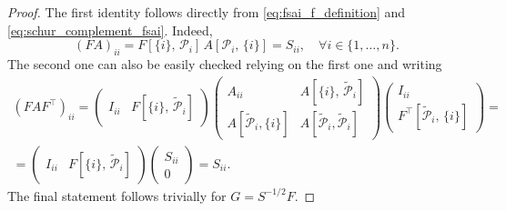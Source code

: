 \documentclass[10pt,a4paper]{amsart}
\begin{document}
\begin{proof}
	The first identity follows directly from \eqref{eq:fsai_f_definition} and \eqref{eq:schur_complement_fsai}. Indeed,
	\begin{equation*}
		(FA)_{ii} = F[\{i\}, \, \mathcal{P}_i] \, A[\mathcal{P}_i,\, \{i\}] = S_{ii}, \quad \forall i \in \{1,\dots,n\}.
	\end{equation*}
	The second one can also be easily checked relying on the first one and writing
	\begin{multline*}
		(F A F^{\top})_{ii} = \begin{pmatrix}
			I_{ii} & F[\{i\}, \, \tilde{\mathcal{P}}_i]
		\end{pmatrix}
		\begin{pmatrix}
			A_{ii} & A[\{i\},\, \tilde{\mathcal{P}}_i] \\
			A[\tilde{\mathcal{P}}_i, \{i\}] & A[\tilde{\mathcal{P}}_i, \tilde{\mathcal{P}}_i] 
		\end{pmatrix}
		\begin{pmatrix}
			I_{ii} \\ F^{\top}[\tilde{\mathcal{P}}_i, \, \{i\}]
		\end{pmatrix} =\\
		= \begin{pmatrix}
			I_{ii} & F[\{i\}, \, \tilde{\mathcal{P}}_i]
		\end{pmatrix}
		\begin{pmatrix}
			S_{ii} \\ 0
		\end{pmatrix} = S_{ii}.
	\end{multline*}
	The final statement follows trivially for \(G = S^{-1/2} F\).
\end{proof}
\end{document}
